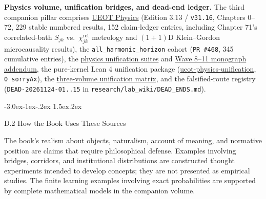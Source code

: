 \documentclass[
  english,
  11pt,
  oneside]{book}
\makeatletter
\renewcommand\section{\@startsection{section}{1}{\z@}%
  {-3.0ex\@plus-1ex\@minus-.2ex}%
  {1.5ex\@plus.2ex}%
  {\normalfont\Large\bfseries\raggedright\hyphenpenalty=10000\exhyphenpenalty=10000}}
\makeatother
\begin{document}
\textbf{Physics volume, unification bridges, and dead-end ledger.} The third companion pillar comprises \href{https://github.com/MurphyHoops/UEOT/blob/3d443ec29eb17af1fc00699a74e2d42d73516d81/physics/qm/book/UEOT_PHYSICS.en.md}{UEOT Physics} (Edition 3.13 / \texttt{v31.16}, Chapters 0--72, 229 stable numbered results, 152 claim-ledger entries, including Chapter 71's correlated-bath \(S_{jk}\) vs.~\(\chi^{\mathrm{ret}}_{jk}\) metrology and \((1+1)\)D Klein--Gordon microcausality results), the \texttt{all\_harmonic\_horizon} cohort (\texttt{PR\ \#468}, 345 cumulative entries), the \href{https://github.com/MurphyHoops/UEOT/blob/3d443ec29eb17af1fc00699a74e2d42d73516d81/physics/unification/README.md}{physics unification suites} and \href{https://github.com/MurphyHoops/UEOT/blob/3d443ec29eb17af1fc00699a74e2d42d73516d81/physics/unification/WAVE8_11_MONOGRAPH_ADDENDUM.md}{Wave 8--11 monograph addendum}, the pure-kernel Lean 4 unification package (\href{https://github.com/MurphyHoops/UEOT/blob/3d443ec29eb17af1fc00699a74e2d42d73516d81/formalization/ueot-physics-unification/README.md}{ueot-physics-unification}, \texttt{0\ sorryAx}), the \href{https://github.com/MurphyHoops/UEOT/blob/3d443ec29eb17af1fc00699a74e2d42d73516d81/physics/interfaces/PHILOSOPHY_MATHEMATICS_PHYSICS_UNIFICATION_MATRIX.md}{three-volume unification matrix}, and the falsified-route registry (\texttt{DEAD-20261124-01..15} in \nolinkurl{research/lab_wiki/DEAD_ENDS.md}).

\section{D.2 How the Book Uses These Sources}\label{ph-d-2}

The book's realism about objects, naturalism, account of meaning, and normative position are claims that require philosophical defense. Examples involving bridges, corridors, and institutional distributions are constructed thought experiments intended to develop concepts; they are not presented as empirical studies. The finite learning examples involving exact probabilities are supported by complete mathematical models in the companion volume.
\end{document}
